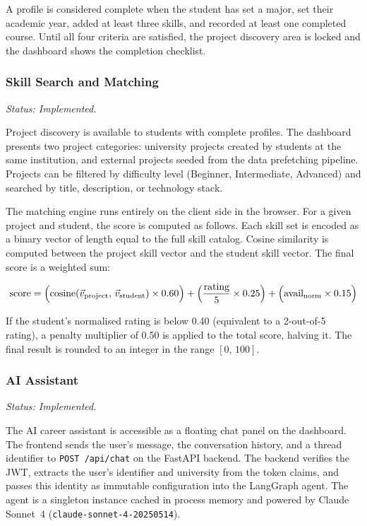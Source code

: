 \documentclass[12pt,a4paper]{article}
\begin{document}
A profile is considered complete when the student has set a major, set their academic year,
added at least three skills, and recorded at least one completed course. Until all four
criteria are satisfied, the project discovery area is locked and the dashboard shows the
completion checklist.

\subsubsection{Skill Search and Matching}

\textit{Status: Implemented.}

Project discovery is available to students with complete profiles. The dashboard presents
two project categories: university projects created by students at the same institution,
and external projects seeded from the data prefetching pipeline. Projects can be filtered
by difficulty level (Beginner, Intermediate, Advanced) and searched by title, description,
or technology stack.

The matching engine runs entirely on the client side in the browser. For a given project
and student, the score is computed as follows. Each skill set is encoded as a binary vector
of length equal to the full skill catalog. Cosine similarity is computed between the project
skill vector and the student skill vector. The final score is a weighted sum:

\begin{equation}
  \text{score} =
    \Bigl(\text{cosine}(\vec{v}_{\text{project}},\, \vec{v}_{\text{student}}) \times 0.60\Bigr)
    + \Bigl(\frac{\text{rating}}{5} \times 0.25\Bigr)
    + \Bigl(\text{avail}_{\text{norm}} \times 0.15\Bigr)
\end{equation}

If the student's normalised rating is below 0.40 (equivalent to a 2-out-of-5 rating), a
penalty multiplier of 0.50 is applied to the total score, halving it. The final result is
rounded to an integer in the range $[0,\, 100]$.

\subsubsection{AI Assistant}

\textit{Status: Implemented.}

The AI career assistant is accessible as a floating chat panel on the dashboard. The
frontend sends the user's message, the conversation history, and a thread identifier to
\texttt{POST /api/chat} on the FastAPI backend. The backend verifies the JWT, extracts
the user's identifier and university from the token claims, and passes this identity as
immutable configuration into the LangGraph agent. The agent is a singleton instance
cached in process memory and powered by Claude Sonnet~4 (\texttt{claude-sonnet-4-20250514}).
\end{document}
